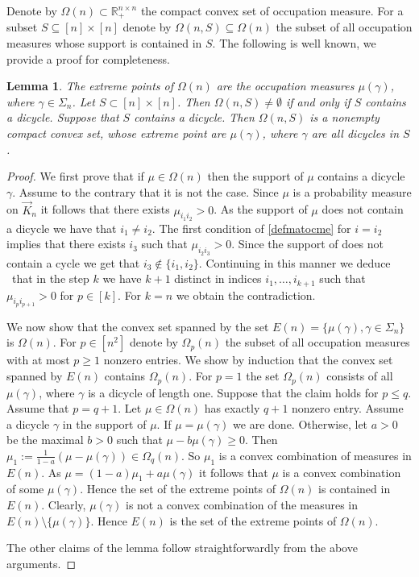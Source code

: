 \documentclass{amsart}
\newcommand{\kdigraph}{\vec{K}}
\newcommand{\R}{\mathbb{R}}
\newcommand{\0}{\mathbf{0}}
\newcommand{\1}{\mathbf{1}}
\newtheorem{lemma}[theo]{Lemma}
\theoremstyle{remark}
\numberwithin{equation}{section} %
\renewcommand{\ge}{\geqslant}
\renewcommand{\le}{\leqslant}
\begin{document}
 
Denote by $\Omega(n)\subset\R_+^{n \times n}$ the compact convex set of occupation measure.  
For a subset $S\subseteq [n]\times [n]$ denote by $\Omega(n, S)\subseteq \Omega(n)$ the subset of all occupation measures whose support is contained in $S$.
The following is well known, we provide a proof for completeness. 
\begin{lemma}\label{extptdOmega}  The extreme points of $\Omega(n)$ are the occupation measures $\mu(\gamma)$, where $\gamma\in \Sigma_n$.
Let $S\subset [n]\times [n]$.  Then $\Omega(n, S)\ne \emptyset$ if and only if $S$ contains a dicycle.  Suppose that $S$ contains a dicycle.  Then $\Omega(n, S)$
is a nonempty compact convex set, whose extreme point are $\mu(\gamma)$, where $\gamma$ are all dicycles in $S$.
\end{lemma}
\begin{proof}  We first prove that if $\mu\in \Omega(n)$ then the support of $\mu$ contains a dicycle $\gamma$.  Assume to the contrary that it is not the case.
Since $\mu$ is a probability measure on $\kdigraph_n$ it follows that there exists $\mu_{i_1i_2}>0$. As the support of $\mu$ does not contain a dicycle we have that $i_1\ne i_2$.  The first condition of \eqref{defmatocme} for $i=i_2$ implies that there exists $i_3$ such that $\mu_{i_2i_3}>0$.  Since the support of does not contain a cycle we get that $i_3\notin \{i_1,i_2\}$. Continuing in this manner we deduce \ that in the step $k$ we have $k+1$ distinct in indices $i_1,\ldots,i_{k+1}$ such that $\mu_{i_pi_{p+1}}>0$ for $p\in[k]$.  For $k=n$ we obtain the contradiction.

We now show that the convex set spanned by the set $E(n)=\{\mu(\gamma), \gamma\in\Sigma_n\}$ is $\Omega(n)$.
For $p\in[n^2]$ denote by $\Omega_p(n)$ the subset of all occupation measures with at most $p\ge 1$ nonzero entries.
We show by induction that the convex set spanned by $E(n)$ contains $\Omega_p(n)$.  For $p=1$ the set $\Omega_p(n)$ consists of all $\mu(\gamma)$, where
$\gamma$ is a dicycle of length one.  Suppose that the claim holds for $p\le q$.  Assume that $p=q+1$.  Let $\mu\in \Omega(n)$ has exactly $q+1$ nonzero entry.
Assume a dicycle $\gamma$ in the support of $\mu$.  If $\mu=\mu(\gamma)$ we are done.  Otherwise,
let $a>0$ be the maximal $b>0$ such that $\mu -b\mu(\gamma)\ge 0$.   Then $\mu_1:=\frac{1}{1-a}(\mu-\mu(\gamma))\in \Omega_{q}(n)$.  So $\mu_1$ is a convex combination
of measures in $E(n)$.  As $\mu=(1-a)\mu_1+a\mu(\gamma)$ it follows that $\mu$ is a convex combination of some $\mu(\gamma)$.
Hence the set of the extreme points of $\Omega(n)$ is contained in $E(n)$.  Clearly, $\mu(\gamma)$ is not a convex combination of the measures in $E(n)\setminus\{\mu(\gamma)\}$.  Hence $E(n)$ is the set of the extreme points of $\Omega(n)$.

 The other claims of the lemma follow straightforwardly from the above arguments.\end{proof} 
\end{document}
